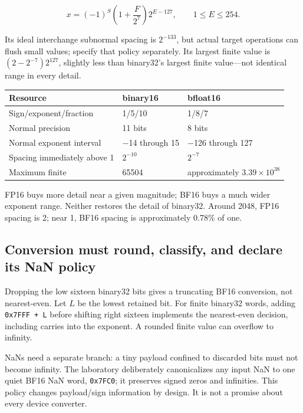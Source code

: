 \[
x=(-1)^S\left(1+\frac{F}{2^7}\right)2^{E-127},
\qquad1\le E\le254.
\]

Its ideal interchange subnormal spacing is \(2^{-133}\), but actual target operations can flush small values; specify that policy separately. Its largest finite value is \((2-2^{-7})2^{127}\), slightly less than binary32's largest finite value---not identical range in every detail.

{\def\LTcaptype{none} %
\begin{longtable}[]{@{}lll@{}}
\toprule\noalign{}
Resource & binary16 & bfloat16 \\
\midrule\noalign{}
\endhead
\bottomrule\noalign{}
\endlastfoot
Sign/exponent/fraction & 1/5/10 & 1/8/7 \\
Normal precision & 11 bits & 8 bits \\
Normal exponent interval & −14 through 15 & −126 through 127 \\
Spacing immediately above 1 & \(2^{-10}\) & \(2^{-7}\) \\
Maximum finite & 65504 & approximately \(3.39\times10^{38}\) \\
\end{longtable}
}

FP16 buys more detail near a given magnitude; BF16 buys a much wider exponent range. Neither restores the detail of binary32. Around 2048, FP16 spacing is 2; near 1, BF16 spacing is approximately 0.78\% of one.

\subsection{Conversion must round, classify, and declare its NaN policy}\label{05-engine-i-ch001-conversion-must-round-classify-and-declare-its-nan-policy}

Dropping the low sixteen binary32 bits gives a truncating BF16 conversion, not nearest-even. Let \(L\) be the lowest retained bit. For finite binary32 words, adding \texttt{0x7FFF\ +\ L} before shifting right sixteen implements the nearest-even decision, including carries into the exponent. A rounded finite value can overflow to infinity.

NaNs need a separate branch: a tiny payload confined to discarded bits must not become infinity. The laboratory deliberately canonicalizes any input NaN to one quiet BF16 NaN word, \texttt{0x7FC0}; it preserves signed zeros and infinities. This policy changes payload/sign information by design. It is not a promise about every device converter.

